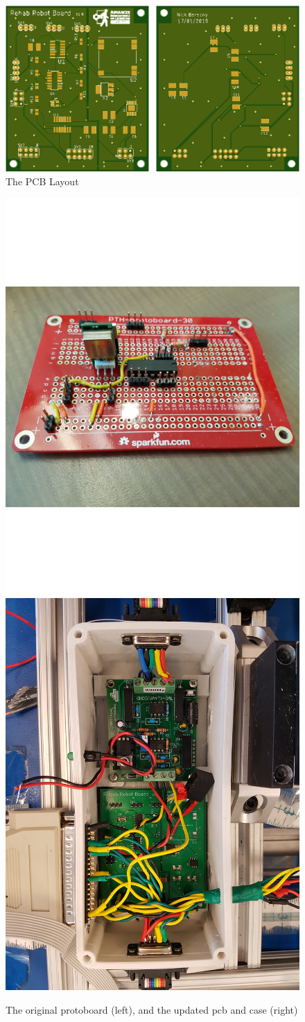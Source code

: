 \documentclass[12pt]{report}
\begin{document}
	\begin{figure}[h] 
		\centering
		\includegraphics[width=0.75\linewidth]{pcb_pic}
		\caption{The PCB Layout}
		\label{fig:pcb_pic}
	\end{figure}
	
		\begin{figure}[h] 
		\centering
		\includegraphics[width=0.4\linewidth]{protoboard}
		\: \:
		\includegraphics[width=0.4\linewidth]{pcb_case}
		\caption{The original protoboard (left), and the updated pcb and case (right)}
		\label{fig:robot_leg}
	\end{figure}
	
\end{document}
